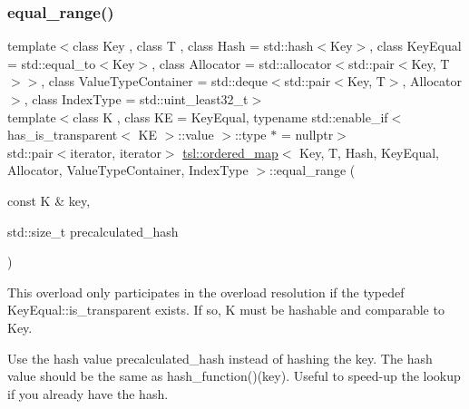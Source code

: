 \subsubsection{\texorpdfstring{equal\_range()}{equal\_range()}\hspace{0.1cm}{\footnotesize\ttfamily [4/6]}}
{\footnotesize\ttfamily template$<$class Key , class T , class Hash  = std\+::hash$<$\+Key$>$, class Key\+Equal  = std\+::equal\+\_\+to$<$\+Key$>$, class Allocator  = std\+::allocator$<$std\+::pair$<$\+Key, T$>$$>$, class Value\+Type\+Container  = std\+::deque$<$std\+::pair$<$\+Key, T$>$, Allocator$>$, class Index\+Type  = std\+::uint\+\_\+least32\+\_\+t$>$ \\
template$<$class K , class KE  = Key\+Equal, typename std\+::enable\+\_\+if$<$ has\+\_\+is\+\_\+transparent$<$ K\+E $>$\+::value $>$\+::type $\ast$  = nullptr$>$ \\
std\+::pair$<$iterator, iterator$>$ \mbox{\hyperlink{classtsl_1_1ordered__map}{tsl\+::ordered\+\_\+map}}$<$ Key, T, Hash, Key\+Equal, Allocator, Value\+Type\+Container, Index\+Type $>$\+::equal\+\_\+range (\begin{DoxyParamCaption}\item[{const K \&}]{key,  }\item[{std\+::size\+\_\+t}]{precalculated\+\_\+hash }\end{DoxyParamCaption})\hspace{0.3cm}{\ttfamily [inline]}}





This overload only participates in the overload resolution if the typedef Key\+Equal\+::is\+\_\+transparent exists. If so, K must be hashable and comparable to Key.

Use the hash value \textquotesingle{}precalculated\+\_\+hash\textquotesingle{} instead of hashing the key. The hash value should be the same as hash\+\_\+function()(key). Useful to speed-\/up the lookup if you already have the hash. \mbox{\label{classtsl_1_1ordered__map_aa9692eec4de167529fa5e5f2b04ea18d}} 
